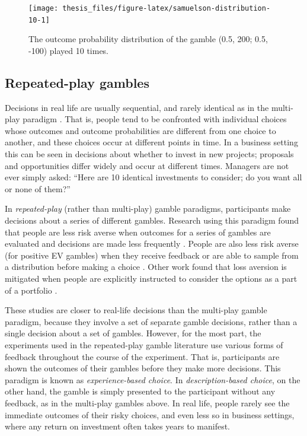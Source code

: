 \documentclass[a4paper, nobind, dvipsnames]{templates/ociamthesis}
\theoremstyle{definition}
\theoremstyle{definition}
\theoremstyle{definition}
\theoremstyle{definition}
\theoremstyle{remark}
\begin{document}
\begin{figure}
\texttt{[image: thesis\_files/figure-latex/samuelson-distribution-10-1]} \caption{The outcome probability distribution of the \textcite{samuelson1963} gamble (0.5, 200; 0.5, -100) played 10 times.}\label{fig:samuelson-distribution-10}
\end{figure}

\hypertarget{repeated-play-gambles}{%
\subsection{Repeated-play gambles}\label{repeated-play-gambles}}

Decisions in real life are usually sequential, and rarely identical as in the
multi-play paradigm \autocite[cf.][]{barron2003}. That is, people tend to be confronted
with individual choices whose outcomes and outcome probabilities are different
from one choice to another, and these choices occur at different points in time.
In a business setting this can be seen in decisions about whether to invest in
new projects; proposals and opportunities differ widely and occur at different
times. Managers are not ever simply asked: ``Here are 10 identical investments to
consider; do you want all or none of them?''

In \emph{repeated-play} (rather than multi-play) gamble paradigms, participants make
decisions about a series of different gambles. Research using this paradigm
found that people are less risk averse when outcomes for a series of gambles are
evaluated and decisions are made less frequently \autocite{gneezy1997,thaler1997,bellemare2005,beshears2016}. People are also less risk averse (for positive
EV gambles) when they receive feedback or are able to sample from a distribution
before making a choice \autocite{camilleri2011,camilleri2013,barron2003,wulff2018,ludvig2011,hertwig2004,jessup2008}. Other work found that loss
aversion is mitigated when people are explicitly instructed to consider the
options as a part of a portfolio \autocite{sokolhessner2009,sokolhessner2012}.

These studies are closer to real-life decisions than the multi-play gamble
paradigm, because they involve a set of separate gamble decisions, rather than a
single decision about a set of gambles. However, for the most part, the
experiments used in the repeated-play gamble literature use various forms of
feedback throughout the course of the experiment. That is, participants are
shown the outcomes of their gambles before they make more decisions. This
paradigm is known as \emph{experience-based choice}. In \emph{description-based choice},
on the other hand, the gamble is simply presented to the participant without any
feedback, as in the multi-play gambles above. In real life, people rarely see
the immediate outcomes of their risky choices, and even less so in business
settings, where any return on investment often takes years to manifest.
\end{document}
